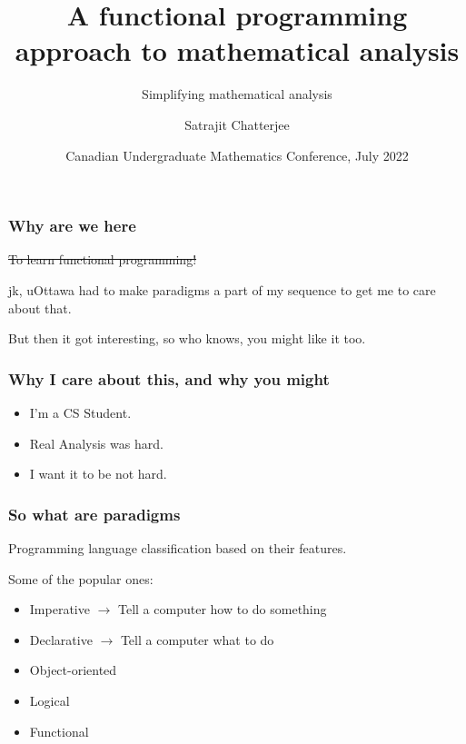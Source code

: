 \documentclass[handout]{beamer}
\title[Functional Mathematical Analysis] %
{A functional programming approach to mathematical analysis}
\subtitle{Simplifying mathematical analysis}
\author[Satrajit Chatterjee] %
{Satrajit Chatterjee}
\institute[VFU] %
{
    Computer Science and Mathematics\\
    University of Ottawa
}
\date[VLC 2021] %
{Canadian Undergraduate Mathematics Conference, July 2022}
\begin{document}
    \frame{\titlepage}



    \begin{frame}[t]
        \frametitle{Why are we here}

        \sout{To learn functional programming!}

        \vspace{20px}

        jk, uOttawa had to make paradigms a part of my sequence to get me to care about that. \pause

        \vspace{10px}

        But then it got interesting, so who knows, you might like it too.

    \end{frame}

    \begin{frame}
        \frametitle{Why I care about this, and why you might}

        \begin{itemize}
            \item<1-> I'm a CS Student.
            \item<2-> Real Analysis was hard.
            \item<3-> I want it to be not hard.
        \end{itemize}
    \end{frame}

    \begin{frame}
        \frametitle{So what are paradigms}

        Programming language classification based on their features. \pause

        Some of the popular ones: \pause

        \begin{itemize}
            \item<3-> Imperative $\rightarrow$ Tell a computer how to do something
            \item<4-> Declarative $\rightarrow$ Tell a computer what to do
            \item<5-> Object-oriented
            \item<6-> Logical
            \item<7-> Functional
        \end{itemize}
    \end{frame}
\end{document}
